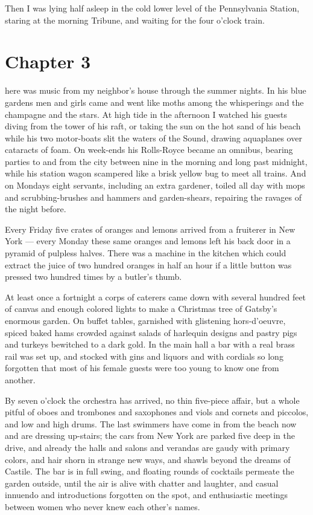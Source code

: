 \documentclass{znotebook}
\begin{document}
Then I was lying half asleep in the cold lower level of the Pennsylvania Station, staring at the morning Tribune, and waiting for the four o'clock train.

\chapter{Chapter 3}

\lettrine[findent=2pt]{}{ }here was music from my neighbor's house through the summer nights. In his blue gardens men and girls came and went like moths among the whisperings and the champagne and the stars. At high tide in the afternoon I watched his guests diving from the tower of his raft, or taking the sun on the hot sand of his beach while his two motor-boats slit the waters of the Sound, drawing aquaplanes over cataracts of foam. On week-ends his Rolls-Royce became an omnibus, bearing parties to and from the city between nine in the morning and long past midnight, while his station wagon scampered like a brisk yellow bug to meet all trains. And on Mondays eight servants, including an extra gardener, toiled all day with mops and scrubbing-brushes and hammers and garden-shears, repairing the ravages of the night before.

Every Friday five crates of oranges and lemons arrived from a fruiterer in New York ---{} every Monday these same oranges and lemons left his back door in a pyramid of pulpless halves. There was a machine in the kitchen which could extract the juice of two hundred oranges in half an hour if a little button was pressed two hundred times by a butler's thumb.

At least once a fortnight a corps of caterers came down with several hundred feet of canvas and enough colored lights to make a Christmas tree of Gatsby's enormous garden. On buffet tables, garnished with glistening hors-d'oeuvre, spiced baked hams crowded against salads of harlequin designs and pastry pigs and turkeys bewitched to a dark gold. In the main hall a bar with a real brass rail was set up, and stocked with gins and liquors and with cordials so long forgotten that most of his female guests were too young to know one from another.

By seven o'clock the orchestra has arrived, no thin five-piece affair, but a whole pitful of oboes and trombones and saxophones and viols and cornets and piccolos, and low and high drums. The last swimmers have come in from the beach now and are dressing up-stairs; the cars from New York are parked five deep in the drive, and already the halls and salons and verandas are gaudy with primary colors, and hair shorn in strange new ways, and shawls beyond the dreams of Castile. The bar is in full swing, and floating rounds of cocktails permeate the garden outside, until the air is alive with chatter and laughter, and casual innuendo and introductions forgotten on the spot, and enthusiastic meetings between women who never knew each other's names.
\end{document}
